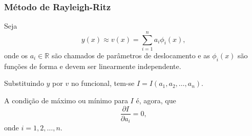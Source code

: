 \documentclass{beamer}
\begin{document}
	\begin{frame}
		\frametitle{Método de Rayleigh-Ritz}
		\justify
		
		Seja
		$$
			y(x) \approx v(x)=\sum_{i=1}^n a_i \phi_i(x)
			\text{,}
		$$
		onde os $a_i\in\mathbb{R}$ são chamados de parâmetros de deslocamento e as $\phi_i(x)$ são funções de forma e devem ser linearmente independente.
		\vspace{10pt}
		\pause
		
		Substituindo $y$ por $v$ no funcional, tem-se $I=I(a_1, a_2, \dots, a_n)$.
		\vspace{10pt}
		\pause
		
		A condição de máximo ou mínimo para $I$ é, agora, que
		$$
			\frac{\partial I}{\partial a_i} = 0
			\text{,}
		$$
		onde $i=1,2,\dots,n$.
	\end{frame}
	
\end{document}
